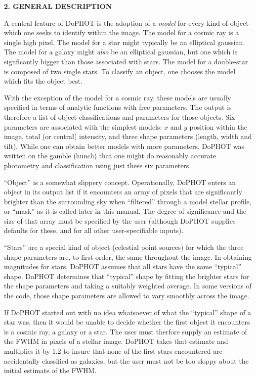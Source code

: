 \centerline{\bf 2.  GENERAL DESCRIPTION}

A central feature of DoPHOT is the adoption of a {\it
model} for every kind of object which one seeks to identify
within the image.  The model for a cosmic ray is a single
high pixel.  The model for a star might typically be an
elliptical gaussian.  The model for a galaxy might {\it
also} be an elliptical gaussian, but one which is
signficantly bigger than those associated with stars.  The
model for a double-star is composed of two single stars.  To
classify an object, one chooses the model which fits the
object best.

With the exception of the model for a cosmic ray, these
models are usually specified in terms of analytic functions with
free parameters.  The output is
therefore a list of object classifications and parameters
for those objects.  Six parameters are associated with the
simplest models: $x$ and $y$ position within the image, total
(or central) intensity, and three shape parameters (length,
width and tilt).  While one can obtain better models with
more parameters, DoPHOT was written on the gamble (hunch)
that one might do reasonably accurate photometry and
classification using just these six parameters.

``Object'' is a somewhat slippery concept.  Operationally,
DoPHOT enters an object in its output list if it encounters
an array of pixels that are significantly brighter than the
surrounding sky when ``filtered'' through a model stellar
profile, or ``mask'' as it is called later in this manual.
The degree of significance and the size of that
array must be specified by the user (although DoPHOT
supplies defaults for these, and for all other user-specifiable inputs).

``Stars'' are a special kind of object (celestial point
sources) for which the three shape parameters are, to first
order, the same throughout the image.  In obtaining
magnitudes for stars, DoPHOT assumes that all stars have the
same ``typical'' shape.  DoPHOT determines that ``typical''
shape by fitting the brighter stars for the shape parameters
and taking a suitably weighted average.  In some versions of the code,
those shape parameters are allowed to vary smoothly across
the image.

If DoPHOT started out with no idea whatsoever of what the
``typical'' shape of a star was, then it would be unable to
decide whether the first object it encounters is a cosmic
ray, a galaxy or a star.  The user must therfore supply an
estimate of the FWHM in pixels of a stellar image.  DoPHOT
takes that estimate and multiplies it by 1.2 to insure that
none of the first stars encountered are accidentally
classified as galaxies, but the user must not be too sloppy
about the initial estimate of the FWHM.

